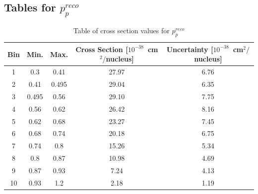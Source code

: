 \FloatBarrier\subsection{Tables for $p_{p}^{reco}$} 
\begin{table}[ht] 
\begin{tabular}{|c|c|c|c|c|} \hline 
Bin & Min. & Max. & Cross Section [$10^{-38}$~cm$^{2}/$nucleus] & Uncertainty [$10^{-38}$~cm$^{2}/$nucleus] \\ \hline 
1 & 0.3 & 0.41 & 27.97 & 6.76 \\ \hline 
2 & 0.41 & 0.495 & 29.04 & 6.35 \\ \hline 
3 & 0.495 & 0.56 & 29.10 & 7.75 \\ \hline 
4 & 0.56 & 0.62 & 26.42 & 8.16 \\ \hline 
5 & 0.62 & 0.68 & 23.27 & 7.45 \\ \hline 
6 & 0.68 & 0.74 & 20.18 & 6.75 \\ \hline 
7 & 0.74 & 0.8 & 15.26 & 5.34 \\ \hline 
8 & 0.8 & 0.87 & 10.98 & 4.69 \\ \hline 
9 & 0.87 & 0.93 & 7.24 & 4.13 \\ \hline 
10 & 0.93 & 1.2 & 2.18 & 1.19 \\ \hline 
\end{tabular} 
\caption{Table of cross section values for $p_{p}^{reco}$} 
\end{table} 
 
